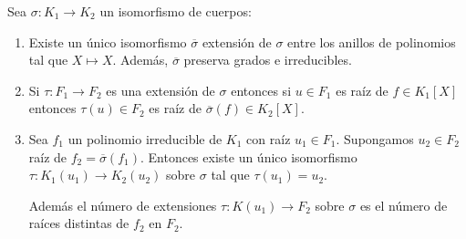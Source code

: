 \begin{proposition}\label{herramientas}
	Sea $\sigma:K_1 \to K_2$ un isomorfismo de cuerpos:
	
	\begin{enumerate}
		\item Existe un único isomorfismo $\overline{\sigma}$ extensión de $\sigma$ entre los anillos de polinomios tal que $X \mapsto X$. Además, $\overline{\sigma}$ preserva grados e irreducibles.  
		\item Si $\tau:F_1 \to F_2$ es una extensión de $\sigma$ entonces si $u \in F_1$ es raíz de $f \in K_1[X]$ entonces $\tau(u) \in F_2$ es raíz de $\overline{\sigma}(f) \in K_2[X]$. 	
		\item Sea $f_1$ un polinomio irreducible de $K_1$ con raíz $u_1 \in F_1$. Supongamos $u_2 \in F_2$ raíz de $f_2 = \overline{\sigma}(f_1)$. Entonces existe un único isomorfismo $\tau: K_1(u_1) \to K_2(u_2)$ sobre $\sigma$ tal que $\tau(u_1) = u_2$.
		
		Además el número de extensiones $\tau:K(u_1) \to F_2$ sobre $\sigma$ es el número de raíces distintas de $f_2$ en $F_2$.
	
		
	\end{enumerate}
\end{proposition}
